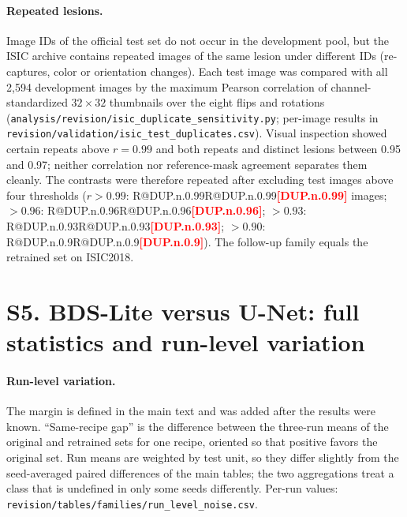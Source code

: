 \documentclass[10pt]{article}
\makeatletter
\newcommand{\R}[1]{\ifcsname R@#1\endcsname\csname R@#1\endcsname\else\textbf{\textcolor{red}{[#1]}}\fi}
\makeatother
\begin{document}
\paragraph{Repeated lesions.} Image IDs of the official test set do not occur in the development pool, but the ISIC archive contains repeated images of the same lesion under different IDs (re-captures, color or orientation changes). Each test image was compared with all 2,594 development images by the maximum Pearson correlation of channel-standardized $32\times32$ thumbnails over the eight flips and rotations (\texttt{analysis/revision/isic\_duplicate\_sensitivity.py}; per-image results in \texttt{revision/validation/isic\_test\_duplicates.csv}). Visual inspection showed certain repeats above $r=0.99$ and both repeats and distinct lesions between 0.95 and 0.97; neither correlation nor reference-mask agreement separates them cleanly. The contrasts were therefore repeated after excluding test images above four thresholds ($r>0.99$: \R{DUP.n.0.99} images; $>0.96$: \R{DUP.n.0.96}; $>0.93$: \R{DUP.n.0.93}; $>0.90$: \R{DUP.n.0.9}). The follow-up family equals the retrained set on ISIC2018.

{\small}

\clearpage
\section*{S5. BDS-Lite versus U-Net: full statistics and run-level variation}
\begin{table}[ht]\centering
\resizebox{\linewidth}{!}{}
\caption{Original models. Oriented $\Delta$ is positive when BDS-Lite is better (distance differences negated). 95\% percentile bootstrap CI over units; Holm correction over five metrics within dataset. $^{*}$Holm $p<0.05$ with a CI excluding zero. SESOI: 0.01 (DSC, IoU, BF1), 2\,px (HD95), 0.5\,px (ASSD).}
\end{table}
\begin{table}[ht]\centering
\resizebox{\linewidth}{!}{}
\caption{Retrained models (same conventions).}
\end{table}

\paragraph{Run-level variation.} The margin is defined in the main text and was added after the results were known. ``Same-recipe gap'' is the difference between the three-run means of the original and retrained sets for one recipe, oriented so that positive favors the original set. Run means are weighted by test unit, so they differ slightly from the seed-averaged paired differences of the main tables; the two aggregations treat a class that is undefined in only some seeds differently. Per-run values: \texttt{revision/tables/families/run\_level\_noise.csv}.
\begin{table}[ht]\centering
\resizebox{\linewidth}{!}{}
\caption{Run-level variation and BDS-Lite differences (differences of run means).}
\end{table}
\end{document}
